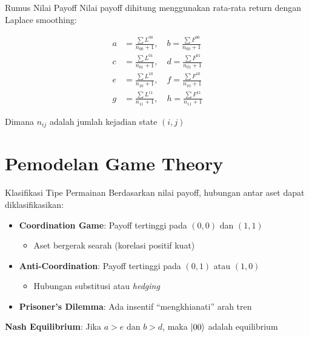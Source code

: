 \documentclass[aspectratio=169]{beamer}
\begin{document}
\begin{frame}{Rumus Nilai Payoff}
    Nilai payoff dihitung menggunakan rata-rata return dengan Laplace smoothing:
    
    \begin{align}
        a &= \frac{\sum L^{00}}{n_{00} + 1}, \quad b = \frac{\sum F^{00}}{n_{00} + 1} \\[10pt]
        c &= \frac{\sum L^{01}}{n_{01} + 1}, \quad d = \frac{\sum F^{01}}{n_{01} + 1} \\[10pt]
        e &= \frac{\sum L^{10}}{n_{10} + 1}, \quad f = \frac{\sum F^{10}}{n_{10} + 1} \\[10pt]
        g &= \frac{\sum L^{11}}{n_{11} + 1}, \quad h = \frac{\sum F^{11}}{n_{11} + 1}
    \end{align}
    
    \vspace{0.3cm}
    Dimana $n_{ij}$ adalah jumlah kejadian state $(i,j)$
\end{frame}

\section{Pemodelan Game Theory}

\begin{frame}{Klasifikasi Tipe Permainan}
    Berdasarkan nilai payoff, hubungan antar aset dapat diklasifikasikan:
    
    \begin{itemize}
        \item \textbf{Coordination Game}: Payoff tertinggi pada $(0,0)$ dan $(1,1)$
            \begin{itemize}
                \item Aset bergerak searah (korelasi positif kuat)
            \end{itemize}
        \item \textbf{Anti-Coordination}: Payoff tertinggi pada $(0,1)$ atau $(1,0)$
            \begin{itemize}
                \item Hubungan substitusi atau \textit{hedging}
            \end{itemize}
        \item \textbf{Prisoner's Dilemma}: Ada insentif ``mengkhianati'' arah tren
    \end{itemize}
    
    \vspace{0.5cm}
    \textbf{Nash Equilibrium}: Jika $a > e$ dan $b > d$, maka $\ket{00}$ adalah equilibrium
\end{frame}
\end{document}

